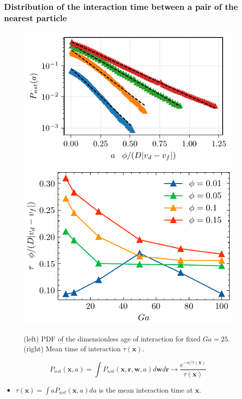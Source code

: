 \documentclass{sintefbeamer}
\begin{document}
\begin{frame}
  \frametitle{Distribution of the interaction time between a pair of the nearest particle}
    \begin{figure}
        \includegraphics[height=0.23\textwidth]{image/HOMOGENEOUS/fDrop/P_a_Ga_25.pdf}
        \includegraphics[height=0.23\textwidth]{image/HOMOGENEOUS/fPA/ageGa.pdf}
        \caption{ (left) PDF of the dimensionless age of interaction for fixed $Ga = 25$.
      (right) Mean time of interaction $\tau(\textbf{x})$.}
    \end{figure}
  \begin{equation*}
    P_{nst}(\textbf{x},a) 
    = \int P_{nst}(\textbf{x},\textbf{r},\textbf{w},a) d\textbf{w}d\textbf{r}
    \rightarrow\frac{e^{-a/\tau(\textbf{x})}}{\tau(\textbf{x})}
  \end{equation*}
\begin{itemize}
  \item $\tau(\textbf{x}) = \int a P_{nst}(\textbf{x},a) da$ is the mean interaction time at $\textbf{x}$. 
\end{itemize}
\end{frame}
\end{document}

